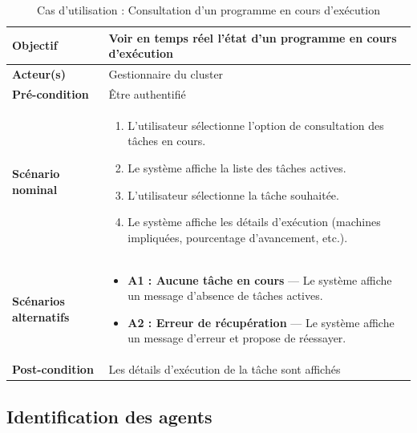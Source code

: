 \documentclass[12pt,a4paper]{report}
\begin{document}
\begin{table}[H]
\centering
\renewcommand{\arraystretch}{1.3}

\begin{tabular}{|p{4cm}|p{11cm}|}
\hline

\textbf{Objectif} & Voir en temps réel l'état d'un programme en cours d'exécution \\ 
\hline

\textbf{Acteur(s)} & Gestionnaire du cluster \\ 
\hline

\textbf{Pré-condition} & Être authentifié \\ 
\hline

\textbf{Scénario nominal} & 
\begin{enumerate}
    \item L'utilisateur sélectionne l'option de consultation des tâches en cours.
    \item Le système affiche la liste des tâches actives.
    \item L'utilisateur sélectionne la tâche souhaitée.
    \item Le système affiche les détails d'exécution (machines impliquées, pourcentage d'avancement, etc.).
\end{enumerate} \\ 
\hline

\textbf{Scénarios alternatifs} & 
\begin{itemize}
    \item \textbf{A1 : Aucune tâche en cours} — Le système affiche un message d'absence de tâches actives.
    \item \textbf{A2 : Erreur de récupération} — Le système affiche un message d'erreur et propose de réessayer.
\end{itemize} \\ 
\hline

\textbf{Post-condition} & Les détails d'exécution de la tâche sont affichés \\ 
\hline

\end{tabular}

\caption{Cas d’utilisation : Consultation d’un programme en cours d’exécution}
\label{tab:view_program}
\end{table}

\subsection{Identification des agents}
\end{document}
